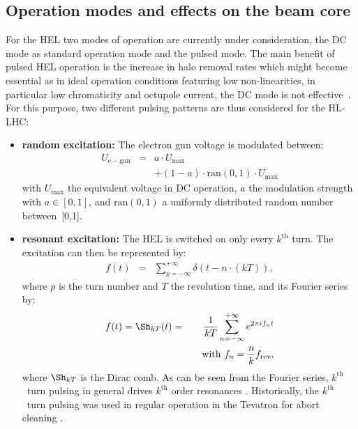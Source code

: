 \documentclass[%
 reprint,
 amsmath,amssymb,
 aps,
prstab,
]{revtex4-1}
\begin{document}
\subsection{Operation modes and effects on the beam core\label{sec:hel:core}}
For the HEL two modes of operation are currently under consideration, the DC mode as standard operation mode and the pulsed mode. The main benefit of pulsed HEL operation is the increase in halo removal rates which might become essential as in ideal operation conditions featuring low non-linearities, in particular low chromaticity and octupole current, the DC mode is not effective~\cite{hel_halo_hllhc_fitterer,hl_halo_ipac2017}. 
For this purpose, two different pulsing patterns are thus considered for the HL-LHC:
\begin{itemize}
	\item \textbf{random excitation:} The electron gun voltage is modulated between:
	\begin{eqnarray}
	U_{\mathrm{e-gun}}&=&a\cdot U_{\mathrm{max}}\\
	& &+(1-a)\cdot \mathrm{ran}(0,1)\cdot U_{\mathrm{max}}
	\end{eqnarray}
	with $U_{\mathrm{max}}$ the equivalent voltage in DC operation, $a$ the modulation strength with $a\in[0,1]$, and $\mathrm{ran}(0,1)$ a uniformly distributed random number between~[0,1].
	\item \textbf{resonant excitation:} The HEL is switched on only every $k^{\mathrm{th}}$ turn. The excitation can then be represented by:
	\begin{eqnarray}\label{intro:eqn:1}
	f(t)&=&\sum_{p=-\infty}^{+\infty}\delta(t-n\cdot(kT)),
	\end{eqnarray}
	where $p$ is the turn number and $T$ the revolution time, and its Fourier series by:
	\begin{eqnarray}\label{intro:eqn:2}
	f(t)=\Sh_{kT}(t)
	&=&\frac{1}{kT}\sum_{n=-\infty}^{+\infty}e^{2\pi i f_nt} \\
	& & \quad \text{with} \ f_n=\frac{n}{k}f_{\rm rev},
	\end{eqnarray}
	where $\Sh_{kT}$ is the Dirac comb. As can be seen from the Fourier series, $k^{\mathrm{th}}$~turn pulsing in general drives $k^{\mathrm{th}}$ order resonances \cite{md_sim_hel_res_ex_fitterer}. Historically, the $k^{\mathrm{th}}$~turn pulsing was used in regular operation in the Tevatron for abort cleaning \cite{hel_tevatron_abortgap_zhang}.
\end{itemize}
\end{document}
